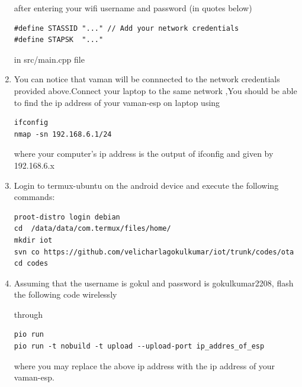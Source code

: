 \documentclass[10pt, a4paper]{article}
\begin{document}
\begin{enumerate}
after entering your wifi username and password (in quotes below)
\begin{lstlisting}
#define STASSID "..." // Add your network credentials
#define STAPSK  "..."
\end{lstlisting}
in src/main.cpp file
\item You can notice that vaman will be connnected to the network credentials provided above.Connect your laptop to the same network ,You should be able to find the ip address of your vaman-esp on laptop using 
\begin{lstlisting}
ifconfig
nmap -sn 192.168.6.1/24
\end{lstlisting}
where your computer's ip address is the output of ifconfig and given by 192.168.6.x
\item Login to termux-ubuntu on the android device and execute the following commands:
\begin{lstlisting}
proot-distro login debian
cd  /data/data/com.termux/files/home/
mkdir iot
svn co https://github.com/velicharlagokulkumar/iot/trunk/codes/ota
cd codes
\end{lstlisting}
\item Assuming that the username is gokul and password is gokulkumar2208, flash the following code wirelessly
\begin{center}
\end{center}
through 
\begin{lstlisting}
pio run 
pio run -t nobuild -t upload --upload-port ip_addres_of_esp
\end{lstlisting}
where you may replace the above ip address with the ip address of your vaman-esp.
\end{enumerate}
\end{document}

